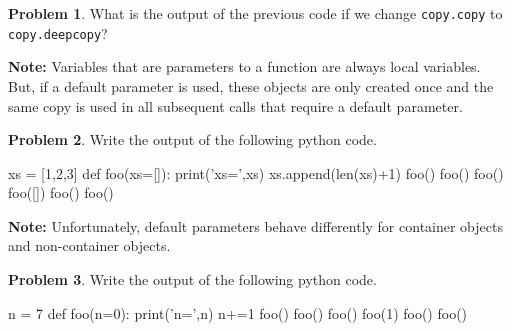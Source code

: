 \documentclass[12pt]{article}
\theoremstyle{definition}
\newtheorem{problem}{Problem}
\begin{document}
\begin{problem}
What is the output of the previous code if we change \texttt{copy.copy} to \texttt{copy.deepcopy}?
\end{problem}
\vspace{2in}
%

\newpage
\noindent
\textbf{Note:}
Variables that are parameters to a function are always local variables.
But, if a default parameter is used, these objects are only created once and the same copy is used in all subsequent calls that require a default parameter.

\begin{problem}
Write the output of the following python code.
\begin{python}
xs = [1,2,3]
def foo(xs=[]):
    print('xs=',xs)
    xs.append(len(xs)+1)
foo()
foo()
foo()
foo([])
foo()
foo()
\end{python}
\end{problem}
\vspace{1.5in}

\noindent
\textbf{Note:}
Unfortunately, default parameters behave differently for container objects and non-container objects.

\begin{problem}
Write the output of the following python code.
\begin{python}
n = 7
def foo(n=0):
    print('n=',n)
    n+=1
foo()
foo()
foo()
foo(1)
foo()
foo()
\end{python}
\end{problem}
\vspace{2in}
\end{document}
